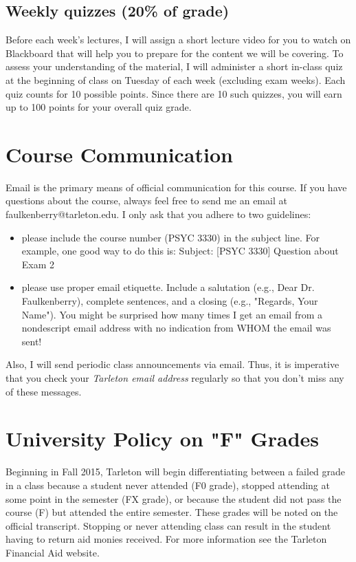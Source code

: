 \documentclass[10pt]{article}
\begin{document}
\subsection*{Weekly quizzes (20\% of grade)}
\label{sec:org207eb77}
Before each week's lectures, I will assign a short lecture video for you to watch on Blackboard that will help you to prepare for the content we will be covering. To assess your understanding of the material, I will administer a short in-class quiz at the beginning of class on Tuesday of each week (excluding exam weeks). Each quiz counts for 10 possible points.  Since there are 10 such quizzes, you will earn up to 100 points for your overall quiz grade.

\section*{Course Communication}
\label{sec:org0aed080}

Email is the primary means of official communication for this course.  If you have questions about the course, always feel free to send me an email at faulkenberry@tarleton.edu.  I only ask that you adhere to two guidelines:
\begin{itemize}
\item please include the course number (PSYC 3330) in the subject line.  For example, one good way to do this is:  Subject: [PSYC 3330] Question about Exam 2
\item please use proper email etiquette.  Include a salutation (e.g., Dear Dr. Faulkenberry), complete sentences, and a closing (e.g., "Regards, Your Name").  You might be surprised how many times I get an email from a nondescript email address with no indication from WHOM the email was sent!
\end{itemize}

Also, I will send periodic class announcements via email.  Thus, it is imperative that you check your \emph{Tarleton email address} regularly so that you don't miss any of these messages.

\section*{University Policy on "F" Grades}
\label{sec:org7a8f5b4}
Beginning in Fall 2015, Tarleton will begin differentiating between a failed grade in a class because a student never attended (F0 grade), stopped attending at some point in the semester (FX grade), or because the student did not pass the course (F) but attended the entire semester. These grades will be noted on the official transcript. Stopping or never attending class can result in the student having to return aid monies received.  For more information see the Tarleton Financial Aid website.
\end{document}
